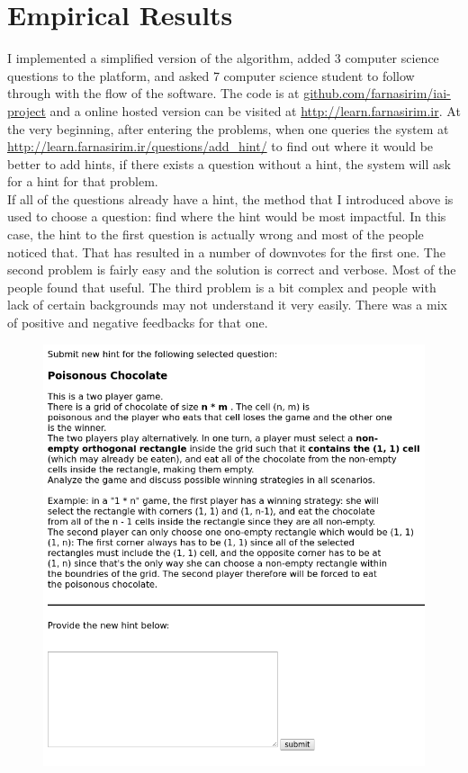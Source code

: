 \documentclass[conference]{IEEEtran}
\begin{document}
	
	\section{Empirical Results}
	I implemented a simplified version of the algorithm, added 3 computer science questions to the platform, and asked 7 computer science student to follow through with the flow of the software. The code is at \href{https://github.com/farnasirim/iai-project}{github.com/farnasirim/iai-project} and a online hosted version can be visited at \href{http://learn.farnasirim.ir}{http://learn.farnasirim.ir}. At the very beginning, after entering the problems, when one queries the system at \href{http://learn.farnasirim.ir/questions/add_hint/}{http://learn.farnasirim.ir/questions/add\_hint/} to find out where it would be better to add hints, if there exists a question without a hint, the system will ask for a hint for that problem.\\
	If all of the questions already have a hint, the method that I introduced above is used to choose a question: find where the hint would
	be most impactful. In this case, the hint to the first question is actually wrong and most of the people noticed that. That has resulted
	in a number of downvotes for the first one. The second problem is fairly easy and the solution is correct and verbose. Most of the people found that useful. The third problem is a bit complex and people with lack of certain backgrounds may not understand it very easily. There was a mix of positive and negative feedbacks for that one.\\
	
	\begin{figure}[!htb]
		\includegraphics[width=0.35\textheight,keepaspectratio]{poisonous}
	\end{figure}
	
\end{document}
